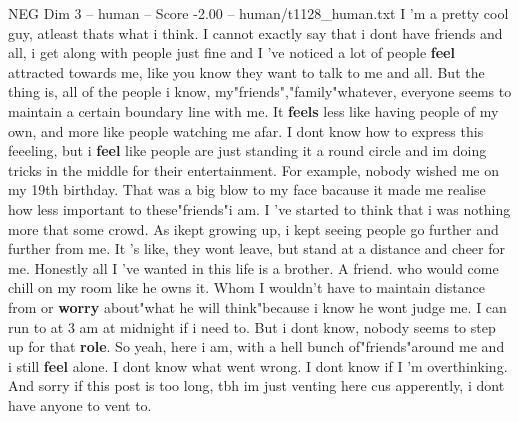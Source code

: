 \begin{textsample}{NEG Dim 3 – human – Score -2.00 – human/t1128\_human.txt}  \label{ex:f3_neg_034}
I 'm a pretty cool guy, atleast thats what i think.
I cannot exactly say that i dont have friends and all, i get along with people just fine and I 've noticed a lot of people \textbf{feel} attracted towards me, like you know they want to talk to me and all.
But the thing is, all of the people i know, my"friends","family"whatever, everyone seems to maintain a certain boundary line with me.
It \textbf{feels} less like having people of my own, and more like people watching me afar.
I dont know how to express this feeeling, but i \textbf{feel} like people are just standing it a round circle and im doing tricks in the middle for their entertainment.
For example, nobody wished me on my 19th birthday.
That was a big blow to my face bacause it made me realise how less important to these"friends"i am.
I 've started to think that i was nothing more that some crowd.
As ikept growing up, i kept seeing people go further and further from me.
It 's like, they wont leave, but stand at a distance and cheer for me.
Honestly all I 've wanted in this life is a brother.
A friend. who would come chill on my room like he owns it.
Whom I wouldn't have to maintain distance from or \textbf{worry} about"what he will think"because i know he wont judge me.
I can run to at 3 am at midnight if i need to.
But i dont know, nobody seems to step up for that \textbf{role}.
So yeah, here i am, with a hell bunch of"friends"around me and i still \textbf{feel} alone.
I dont know what went wrong.
I dont know if I 'm overthinking.
And sorry if this post is too long, tbh im just venting here cus apperently, i dont have anyone to vent to.

\end{textsample}
